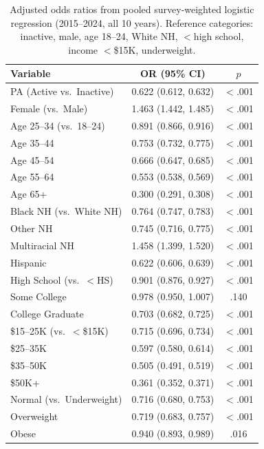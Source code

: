 \documentclass[11pt]{article}
\begin{document}
\begin{table}[h]
\centering
\caption{Adjusted odds ratios from pooled survey-weighted logistic regression (2015--2024, all 10 years). Reference categories: inactive, male, age 18--24, White NH, $<$high school, income $<$\$15K, underweight.}
\label{tab:fullor}
\small
\begin{tabular}{lcc}
\toprule
Variable & OR (95\% CI) & $p$ \\
\midrule
PA (Active vs.\ Inactive) & 0.622 (0.612, 0.632) & $<$.001 \\
Female (vs.\ Male) & 1.463 (1.442, 1.485) & $<$.001 \\
\midrule
Age 25--34 (vs.\ 18--24) & 0.891 (0.866, 0.916) & $<$.001 \\
Age 35--44 & 0.753 (0.732, 0.775) & $<$.001 \\
Age 45--54 & 0.666 (0.647, 0.685) & $<$.001 \\
Age 55--64 & 0.553 (0.538, 0.569) & $<$.001 \\
Age 65+ & 0.300 (0.291, 0.308) & $<$.001 \\
\midrule
Black NH (vs.\ White NH) & 0.764 (0.747, 0.783) & $<$.001 \\
Other NH & 0.745 (0.716, 0.775) & $<$.001 \\
Multiracial NH & 1.458 (1.399, 1.520) & $<$.001 \\
Hispanic & 0.622 (0.606, 0.639) & $<$.001 \\
\midrule
High School (vs.\ $<$HS) & 0.901 (0.876, 0.927) & $<$.001 \\
Some College & 0.978 (0.950, 1.007) & .140 \\
College Graduate & 0.703 (0.682, 0.725) & $<$.001 \\
\midrule
\$15--25K (vs.\ $<$\$15K) & 0.715 (0.696, 0.734) & $<$.001 \\
\$25--35K & 0.597 (0.580, 0.614) & $<$.001 \\
\$35--50K & 0.505 (0.491, 0.519) & $<$.001 \\
\$50K+ & 0.361 (0.352, 0.371) & $<$.001 \\
\midrule
Normal (vs.\ Underweight) & 0.716 (0.680, 0.753) & $<$.001 \\
Overweight & 0.719 (0.683, 0.757) & $<$.001 \\
Obese & 0.940 (0.893, 0.989) & .016 \\
\bottomrule
\end{tabular}
\end{table}
\end{document}
